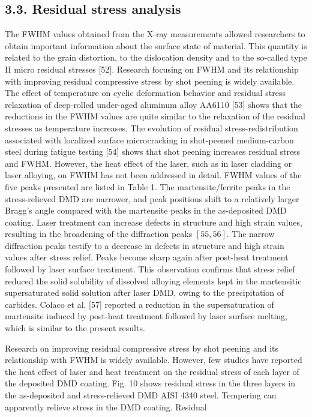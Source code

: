 \documentclass[10pt]{article}
\begin{document}
\subsection*{3.3. Residual stress analysis}
The FWHM values obtained from the X-ray measurements allowed researchers to obtain important information about the surface state of material. This quantity is related to the grain distortion, to the dislocation density and to the so-called type II micro residual stresses [52]. Research focusing on FWHM and its relationship with improving residual compressive stress by shot peening is widely available. The effect of temperature on cyclic deformation behavior and residual stress relaxation of deep-rolled under-aged aluminum alloy AA6110 [53] shows that the reductions in the FWHM values are quite similar to the relaxation of the residual stresses as temperature increases. The evolution of residual stress-redistribution associated with localized surface microcracking in shot-peened medium-carbon steel during fatigue testing [54] shows that shot peening increases residual stress and FWHM. However, the heat effect of the laser, such as in laser cladding or laser alloying, on FWHM has not been addressed in detail. FWHM values of the five peaks presented are listed in Table 1. The martensite/ferrite peaks in the stress-relieved DMD are narrower, and peak positions shift to a relatively larger Bragg's angle compared with the martensite peaks in the as-deposited DMD coating. Laser treatment can increase defects in structure and high strain values, resulting in the broadening of the diffraction peaks $[55,56]$. The narrow diffraction peaks testify to a decrease in defects in structure and high strain values after stress relief. Peaks become sharp again after post-heat treatment followed by laser surface treatment. This observation confirms that stress relief reduced the solid solubility of dissolved alloying elements kept in the martensitic supersaturated solid solution after laser DMD, owing to the precipitation of carbides. Colaco et al. [57] reported a reduction in the supersaturation of martensite induced by post-heat treatment followed by laser surface melting, which is similar to the present results.

Research on improving residual compressive stress by shot peening and its relationship with FWHM is widely available. However, few studies have reported the heat effect of laser and heat treatment on the residual stress of each layer of the deposited DMD coating. Fig. 10 shows residual stress in the three layers in the as-deposited and stress-relieved DMD AISI 4340 steel. Tempering can apparently relieve stress in the DMD coating. Residual
\end{document}
